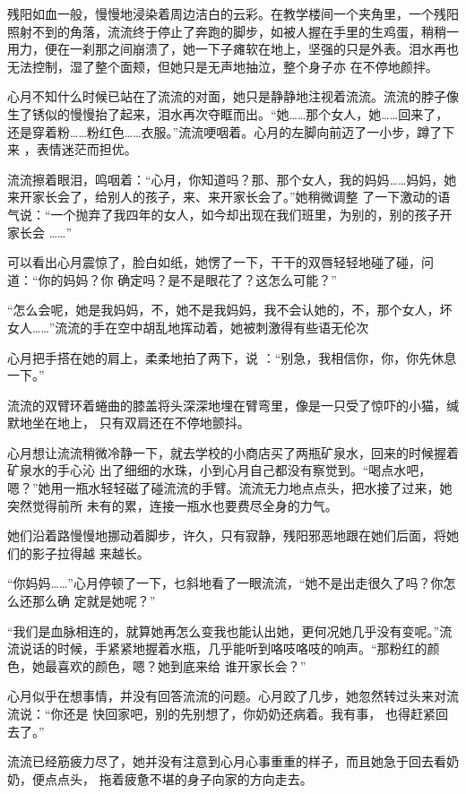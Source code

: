 \documentclass{article}
\begin{document}
残阳如血一般，慢慢地浸染着周边洁白的云彩。在教学楼间一个夹角里，一个残阳照射不到的角落，流流终于停止了奔跑的脚步，如被人握在手里的生鸡蛋，稍稍一用力，便在一刹那之间崩溃了，她一下子瘫软在地上，坚强的只是外表。泪水再也无法控制，湿了整个面颊，但她只是无声地抽泣，整个身子亦
在不停地颜拌。 

心月不知什么时候已站在了流流的对面，她只是静静地注视着流流。流流的脖子像生了锈似的慢慢抬了起来，泪水再次夺眶而出。“她……那个女人，她……回来了，还是穿着粉……粉红色……衣服。”流流哽咽着。心月的左脚向前迈了一小步，蹲了下来
，表情迷茫而担优。 

流流擦着眼泪，鸣咽着：“心月，你知道吗？那、那个女人，我的妈妈……妈妈，她来开家长会了，给别人的孩子，来、来开家长会了。”她稍微调整
\newpage
了一下激动的语气说：“一个抛弃了我四年的女人，如今却出现在我们班里，为别的，别的孩子开家长会
……” 

可以看出心月震惊了，脸白如纸，她愣了一下，干干的双唇轻轻地碰了碰，问道：“你的妈妈？你
确定吗？是不是眼花了？这怎么可能？” 

“怎么会呢，她是我妈妈，不，她不是我妈妈，我不会认她的，不，那个女人，坏女人……”流流的手在空中胡乱地挥动着，她被刺激得有些语无伦次

心月把手搭在她的肩上，柔柔地拍了两下，说
：“别急，我相信你，你，你先休息一下。” 

流流的双臂环着蜷曲的膝盖将头深深地埋在臂弯里，像是一只受了惊吓的小猫，缄默地坐在地上，
只有双肩还在不停地颤抖。 

心月想让流流稍微冷静一下，就去学校的小商店买了两瓶矿泉水，回来的时候握着矿泉水的手心沁
\newpage
出了细细的水珠，小到心月自己都没有察觉到。“喝点水吧，嗯？”她用一瓶水轻轻磁了碰流流的手臂。流流无力地点点头，把水接了过来，她突然觉得前所
未有的累，连接一瓶水也要费尽全身的力气。 

她们沿着路慢慢地挪动着脚步，许久，只有寂静，残阳邪恶地跟在她们后面，将她们的影子拉得越
来越长。 

“你妈妈……”心月停顿了一下，乜斜地看了一眼流流，“她不是出走很久了吗？你怎么还那么确
定就是她呢？” 

“我们是血脉相连的，就算她再怎么变我也能认出她，更何况她几乎没有变呢。”流流说话的时候，手紧紧地握着水瓶，几乎能听到咯吱咯吱的响声。“那粉红的颜色，她最喜欢的颜色，嗯？她到底来给
谁开家长会？” 

心月似乎在想事情，并没有回答流流的问题。心月跤了几步，她忽然转过头来对流流说：“你还是
\newpage
快回家吧，别的先别想了，你奶奶还病着。我有事，
也得赶紧回去了。” 

流流已经筋疲力尽了，她并没有注意到心月心事重重的样子，而且她急于回去看奶奶，便点点头，
拖着疲惫不堪的身子向家的方向走去。 
\end{document}
